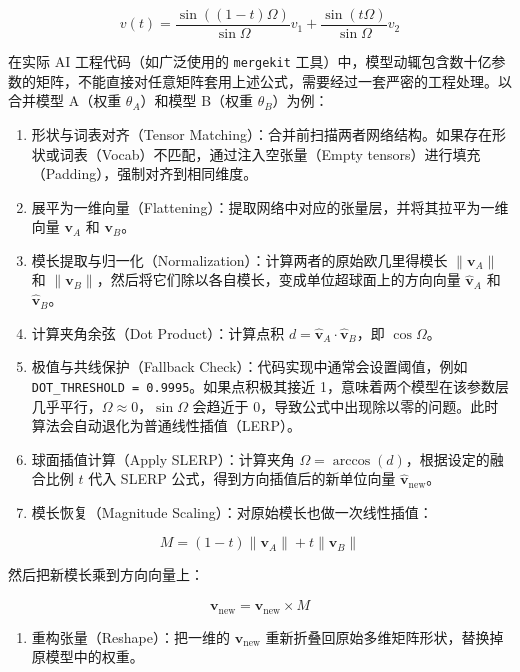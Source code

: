 \[
v(t)=\frac{\sin((1-t)\Omega)}{\sin\Omega}v_1+\frac{\sin(t\Omega)}{\sin\Omega}v_2
\]

在实际 AI 工程代码（如广泛使用的 \texttt{mergekit} 工具）中，模型动辄包含数十亿参数的矩阵，不能直接对任意矩阵套用上述公式，需要经过一套严密的工程处理。以合并模型 A（权重 \(\theta_A\)）和模型 B（权重 \(\theta_B\)）为例：

\begin{enumerate}
\def\labelenumi{\arabic{enumi}.}
\item
  形状与词表对齐（Tensor Matching）：合并前扫描两者网络结构。如果存在形状或词表（Vocab）不匹配，通过注入空张量（Empty tensors）进行填充（Padding），强制对齐到相同维度。
\item
  展平为一维向量（Flattening）：提取网络中对应的张量层，并将其拉平为一维向量 \(\mathbf{v}_A\) 和 \(\mathbf{v}_B\)。
\item
  模长提取与归一化（Normalization）：计算两者的原始欧几里得模长 \(\|\mathbf{v}_A\|\) 和 \(\|\mathbf{v}_B\|\)，然后将它们除以各自模长，变成单位超球面上的方向向量 \(\hat{\mathbf{v}}_A\) 和 \(\hat{\mathbf{v}}_B\)。
\item
  计算夹角余弦（Dot Product）：计算点积 \(d=\hat{\mathbf{v}}_A\cdot\hat{\mathbf{v}}_B\)，即 \(\cos\Omega\)。
\item
  极值与共线保护（Fallback Check）：代码实现中通常会设置阈值，例如 \texttt{DOT\_THRESHOLD\ =\ 0.9995}。如果点积极其接近 1，意味着两个模型在该参数层几乎平行，\(\Omega\approx 0\)，\(\sin\Omega\) 会趋近于 0，导致公式中出现除以零的问题。此时算法会自动退化为普通线性插值（LERP）。
\item
  球面插值计算（Apply SLERP）：计算夹角 \(\Omega=\arccos(d)\)，根据设定的融合比例 \(t\) 代入 SLERP 公式，得到方向插值后的新单位向量 \(\hat{\mathbf{v}}_{\mathrm{new}}\)。
\item
  模长恢复（Magnitude Scaling）：对原始模长也做一次线性插值：
\end{enumerate}

\[
M=(1-t)\|\mathbf{v}_A\|+t\|\mathbf{v}_B\|
\]

然后把新模长乘到方向向量上：

\[
\mathbf{v}_{\mathrm{new}}=\hat{\mathbf{v}}_{\mathrm{new}}\times M
\]

\begin{enumerate}
\def\labelenumi{\arabic{enumi}.}
\setcounter{enumi}{7}
\tightlist
\item
  重构张量（Reshape）：把一维的 \(\mathbf{v}_{\mathrm{new}}\) 重新折叠回原始多维矩阵形状，替换掉原模型中的权重。
\end{enumerate}

